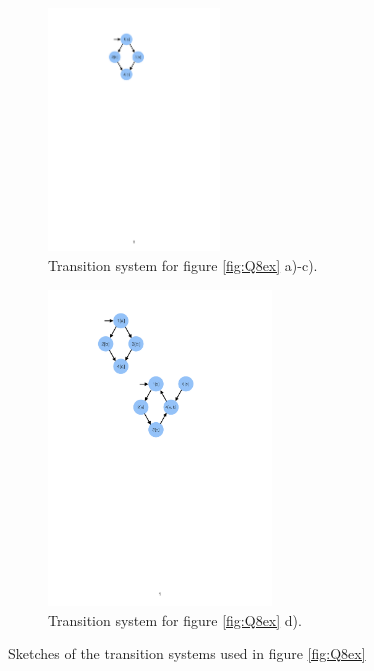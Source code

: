 \begin{figure}[H]
    \begin{subfigure}{0.49\textwidth}
        \centering
        \includegraphics[width=0.5\textwidth]{fig/TS1}
        \caption{Transition system for figure \ref{fig:Q8ex} a)-c).}
        \label{fig:TS1}
    \end{subfigure}
    \begin{subfigure}{0.49\textwidth}
        \centering
        \includegraphics[width=0.65\textwidth]{fig/TS2}
        \caption{Transition system for figure \ref{fig:Q8ex} d).}
        \label{fig:TS2}
    \end{subfigure}
    \caption{Sketches of the transition systems used in figure \ref{fig:Q8ex}}
    \label{fig:Q8sketch}
\end{figure}

